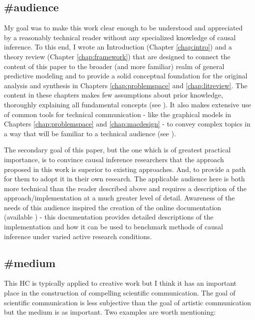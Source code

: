 \documentclass[./main.tex]{subfiles}
\begin{document}

\subsection{\textbf{\#audience}}
\label{hc:audience}

My goal was to make this work clear enough to be understood and appreciated by a reasonably technical reader without any specialized knowledge of causal inference. To this end, I wrote an Introduction (Chapter \ref{chap:intro}) and a theory review (Chapter \ref{chap:framework}) that are designed to connect the content of this paper to the broader (and more familiar) realm of general predictive modeling and to provide a solid conceptual foundation for the original analysis and synthesis in Chapters \ref{chap:problemspace} and \ref{chap:litreview}. The content in these chapters makes few assumptions about prior knowledge, thoroughly explaining all fundamental concepts (see ). It also makes extensive use of common tools for technical communication - like the graphical models in Chapters \ref{chap:problemspace} and \ref{chap:macdesign} - to convey complex topics in a way that will be familiar to a technical audience (see ).

\vspace{\baselineskip}

The secondary goal of this paper, but the one which is of greatest practical importance, is to convince causal inference researchers that the approach proposed in this work is superior to existing approaches. And, to provide a path for them to adopt it in their own research. The applicable audience here is both more technical than the reader described above and requires a description of the approach/implementation at a much greater level of detail. Awareness of the needs of this audience inspired the creation of the online documentation (available ) - this documentation provides detailed descriptions of the implementation and how it can be used to benchmark methods of causal inference under varied active research conditions.


\subsection{\textbf{\#medium}}
\label{hc:medium}

This HC is typically applied to creative work but I think it has an important place in the construction of compelling scientific communication. The goal of scientific communication is less subjective than the goal of artistic communication but the medium is as important. Two examples are worth mentioning:
\end{document}

